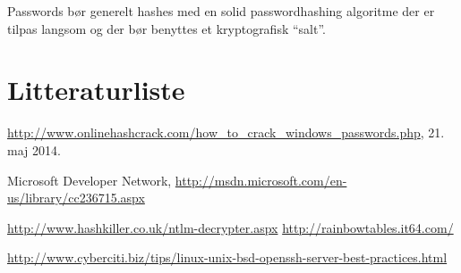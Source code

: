 \documentclass[10pt,a4paper,danish]{article}
\begin{document}
Passwords bør generelt hashes med en solid passwordhashing algoritme der er
tilpas langsom og der bør benyttes et kryptografisk ``salt''.

\section{Litteraturliste}

\begin{thebibliography}{9}

  \url{http://www.onlinehashcrack.com/how_to_crack_windows_passwords.php}, 21.
  maj 2014.

 Microsoft Developer Network,
  \url{http://msdn.microsoft.com/en-us/library/cc236715.aspx}

 \url{http://www.hashkiller.co.uk/ntlm-decrypter.aspx}
 \url{http://rainbowtables.it64.com/}

 \url{http://www.cyberciti.biz/tips/linux-unix-bsd-openssh-server-best-practices.html}
\end{thebibliography}
\end{document}
